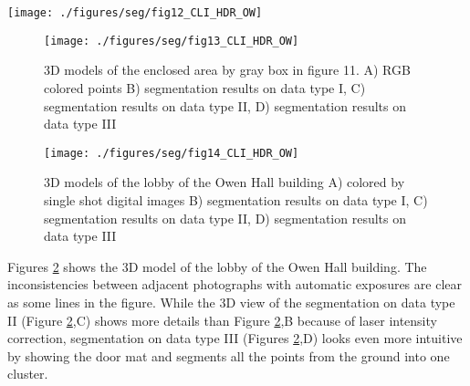 \documentclass[final,3p,times,twocolumn,authoryear]{elsarticle}
\begin{document}
\begin{figure*}
	\centering
	\texttt{[image: ./figures/seg/fig12\_CLI\_HDR\_OW]}
	\caption{3D models of the enclosed area by blue circle in figure11. A) RGB colored points B) segmentation results on data type I, C) segmentation results on data type II, D) segmentation results on data type III}
	\label{fig:fig12_CLI_HDR_OW}
\end{figure*}

\begin{figure}
	\centering
	\texttt{[image: ./figures/seg/fig13\_CLI\_HDR\_OW]}
	\caption{3D models of the enclosed area by gray box in figure 11. A) RGB colored points B) segmentation results on data type I, C) segmentation results on data type II, D) segmentation results on data type III}
	\label{fig:fig13_CLI_HDR_OW}
\end{figure}

\begin{figure}[h]
	\centering
	\texttt{[image: ./figures/seg/fig14\_CLI\_HDR\_OW]}
	\caption{3D models of the lobby of the Owen Hall building A) colored by single shot digital images B) segmentation results on data type I, C) segmentation results on data type II, D) segmentation results on data type III}
	\label{fig:fig14_CLI_HDR_OW}
\end{figure}

Figures \ref{fig:fig14_CLI_HDR_OW} shows the 3D model of the lobby of the Owen Hall building. The inconsistencies between adjacent photographs with automatic exposures are clear as some lines in the figure. While the 3D view of the segmentation on data type II (Figure \ref{fig:fig14_CLI_HDR_OW},C) shows more details than Figure \ref{fig:fig14_CLI_HDR_OW},B because of laser intensity correction, segmentation on data type III (Figures \ref{fig:fig14_CLI_HDR_OW},D) looks even more intuitive by showing the door mat and segments all the points from the ground into one cluster. 
\end{document}
